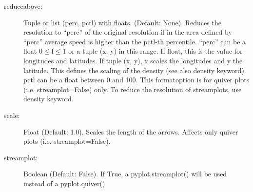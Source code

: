 \begin{description}
    \item[\gls*{reduceabove}:] \label{item:reduceabove}  Tuple or list (perc, pctl) with floats. (Default: None). Reduces the resolution to \enquote{perc} of the original resolution if in the area defined by \enquote{perc} average speed is higher than the pctl-th percentile. \enquote{perc} can be a float 0$\leq$f$\leq$1 or a tuple (x, y) in this range. If float, this is the value for longitudes and latitudes. If tuple (x, y), x scales the longitudes and y the latitude. This defines the scaling of the density (see also density keyword). pctl can be a float between 0 and 100. This formatoption is for quiver plots (i.e. streamplot=False) only. To reduce the resolution of streamplots, use density keyword.
    \item[\gls*{scale}:] \label{item:scale}  Float (Default: 1.0). Scales the length of the arrows. Affects only quiver plots (i.e. streamplot=False).
    \item[\gls*{streamplot}:] \label{item:streamplot}  Boolean (Default: False). If True, a pyplot.streamplot() will be used instead of a pyplot.quiver()
\end{description}

